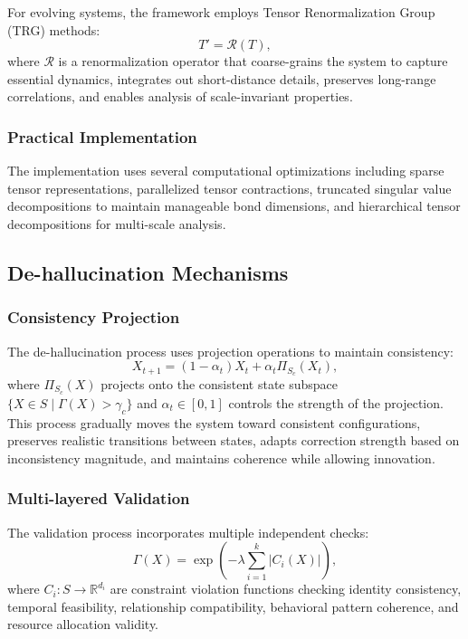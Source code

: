 \documentclass[11pt,a4paper]{article}
\begin{document}
For evolving systems, the framework employs Tensor Renormalization Group (TRG) methods:
\begin{equation}
T' = \mathcal{R}(T),
\end{equation}
where $\mathcal{R}$ is a renormalization operator that coarse-grains the system to capture essential dynamics, integrates out short-distance details, preserves long-range correlations, and enables analysis of scale-invariant properties.

\subsubsection{Practical Implementation}

The implementation uses several computational optimizations including sparse tensor representations, parallelized tensor contractions, truncated singular value decompositions to maintain manageable bond dimensions, and hierarchical tensor decompositions for multi-scale analysis.

\subsection{De-hallucination Mechanisms}

\subsubsection{Consistency Projection}

The de-hallucination process uses projection operations to maintain consistency:
\begin{equation}
X_{t+1} = (1 - \alpha_t)X_t + \alpha_t \Pi_{S_c}(X_t),
\end{equation}
where $\Pi_{S_c}(X)$ projects onto the consistent state subspace $\{X \in S \mid \Gamma(X) > \gamma_c\}$ and $\alpha_t \in [0, 1]$ controls the strength of the projection. This process gradually moves the system toward consistent configurations, preserves realistic transitions between states, adapts correction strength based on inconsistency magnitude, and maintains coherence while allowing innovation.

\subsubsection{Multi-layered Validation}

The validation process incorporates multiple independent checks:
\begin{equation}
\Gamma(X) = \exp\left(-\lambda \sum_{i=1}^k |C_i(X)|\right),
\end{equation}
where $C_i : S \to \mathbb{R}^{d_i}$ are constraint violation functions checking identity consistency, temporal feasibility, relationship compatibility, behavioral pattern coherence, and resource allocation validity.
\end{document}
